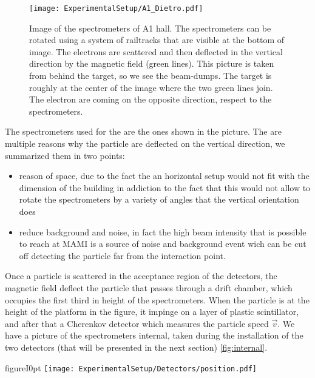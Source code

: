 \begin{figure}
\centering
\caption{Image of the spectrometers of A1 hall. The spectrometers can be rotated using a system of railtracks that are visible at the bottom of image. The electrons are scattered and then deflected in the vertical direction by the magnetic field (green lines). This picture is taken from behind the target, so we see the beam-dumps. The target is roughly at the center of the image where the two green lines join. The electron are coming on the opposite direction, respect to the spectrometers.}\label{fig:TwoDetectors}
\texttt{[image: ExperimentalSetup/A1\_Dietro.pdf]}
\end{figure}


The spectrometers used for the \transv are the ones shown in the picture. The are multiple reasons why the particle are deflected on the vertical direction, we summarized them in two points: 
\begin{itemize}
\item reason of space, due to the fact the an horizontal setup would not fit with the dimension of the building in addiction to the fact that this would not allow to rotate the spectrometers by a variety of angles that the vertical orientation does
\item reduce background and noise, in fact the high beam intensity that is possible to reach at MAMI is a source of noise and background event wich can be cut off detecting the particle far from the interaction point. 
\end{itemize}      

Once a particle is scattered in the acceptance region of the detectors, the magnetic field deflect the particle that passes through a drift chamber, which occupies the first third in height of the spectrometers. When the particle is at the height of the platform in the figure, it impinge on a layer of plastic scintillator, and after that a Cherenkov detector which measures the particle speed $\vec{v}$. We have a picture of the spectrometers internal, taken during the installation of the two detectors (that will be presented in the next section) \ref{fig:internal}.

\begin{wrapfloat}{figure}{I}{0pt}
\texttt{[image: ExperimentalSetup/Detectors/position.pdf]}
\caption{Internal of the A spectrometer. This image was taken during the installation of the detector A inside the red spectrometer, that is accessible from the platform visible in the other picture : \ref{fig:TwoDetectors}}
\label{fig:internal}
\end{wrapfloat}

